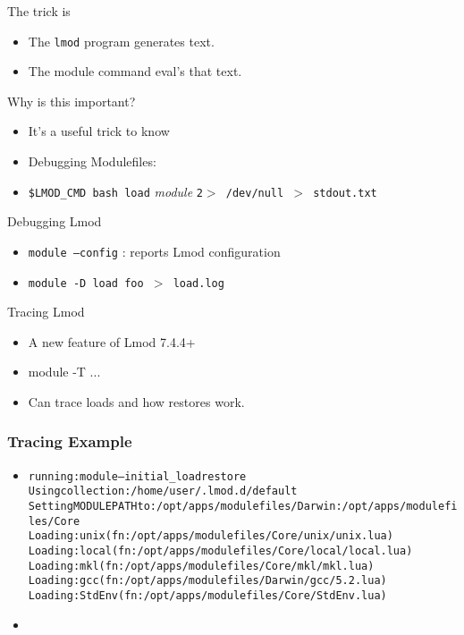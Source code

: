 \documentclass[dvipsnames,aspectratio=169]{beamer}
\begin{document}
\begin{frame}{The trick is}
  \begin{itemize}
    \item The \texttt{lmod} program generates text.
    \item The module command eval's that text.
  \end{itemize}
\end{frame}

\begin{frame}{Why is this important?}
  \begin{itemize}
    \item It's a useful trick to know
    \item Debugging Modulefiles:
    \item \texttt{\$LMOD\_CMD bash load} \emph{module} \texttt{2$>$
        /dev/null $>$ stdout.txt}
  \end{itemize}
\end{frame}

\begin{frame}{Debugging Lmod}
  \begin{itemize}
    \item \texttt{module --config} : reports Lmod configuration
    \item \texttt{module -D load foo $>$ load.log}
  \end{itemize}
\end{frame}

\begin{frame}{Tracing Lmod}
  \begin{itemize}
    \item A new feature of Lmod 7.4.4+
    \item module -T ...
    \item Can trace loads and how restores work.
  \end{itemize}
\end{frame}

\begin{frame}[fragile]
    \frametitle{Tracing Example}
  \begin{itemize}
    \item 
  {\small
    \begin{alltt}
running: module --initial_load restore
  Using collection:      /home/user/.lmod.d/default
  Setting MODULEPATH to: /opt/apps/modulefiles/Darwin:/opt/apps/modulefiles/Core
  Loading: unix (fn: /opt/apps/modulefiles/Core/unix/unix.lua)
  Loading: local (fn: /opt/apps/modulefiles/Core/local/local.lua)
  Loading: mkl (fn: /opt/apps/modulefiles/Core/mkl/mkl.lua)
  Loading: gcc (fn: /opt/apps/modulefiles/Darwin/gcc/5.2.lua)
  Loading: StdEnv (fn: /opt/apps/modulefiles/Core/StdEnv.lua)
    \end{alltt}
}
    \item 
  \end{itemize}
\end{frame}
\end{document}
